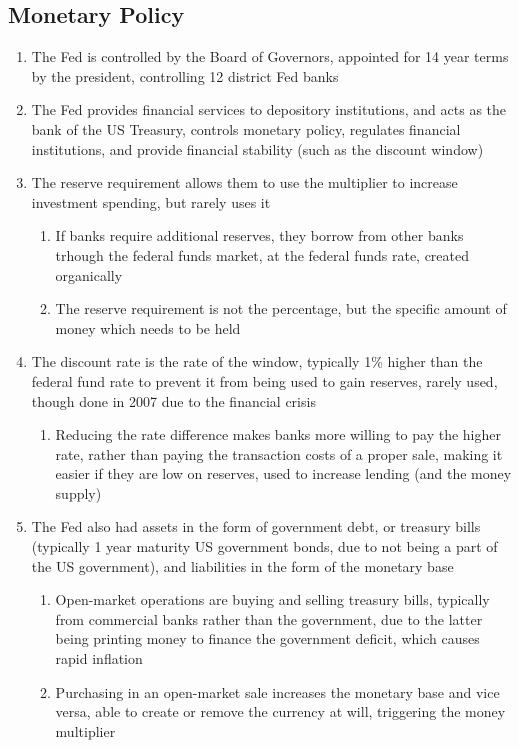 \subsection{Monetary Policy}
\begin{enumerate}
\item The Fed is controlled by the Board of Governors, appointed for 14 year terms by the president, controlling 12 district Fed banks
\item The Fed provides financial services to depository institutions, and acts as the bank of the US Treasury, controls monetary policy, regulates financial institutions, and provide financial stability (such as the discount window)
\item The reserve requirement allows them to use the multiplier to increase investment spending, but rarely uses it
\begin{enumerate}
\item If banks require additional reserves, they borrow from other banks trhough the federal funds market, at the federal funds rate, created organically
\item The reserve requirement is not the percentage, but the specific amount of money which needs to be held
\end{enumerate}
\item The discount rate is the rate of the window, typically 1\% higher than the federal fund rate to prevent it from being used to gain reserves, rarely used, though done in 2007 due to the financial crisis
\begin{enumerate}
\item Reducing the rate difference makes banks more willing to pay the higher rate, rather than paying the transaction costs of a proper sale, making it easier if they are low on reserves, used to increase lending (and the money supply)
\end{enumerate}
\item The Fed also had assets in the form of government debt, or treasury bills (typically 1 year maturity US government bonds, due to not being a part of the US government), and liabilities in the form of the monetary base
\begin{enumerate}
\item Open-market operations are buying and selling treasury bills, typically from commercial banks rather than the government, due to the latter being printing money to finance the government deficit, which causes rapid inflation
\item Purchasing in an open-market sale increases the monetary base and vice versa, able to create or remove the currency at will, triggering the money multiplier
\end{enumerate}
\end{enumerate}

